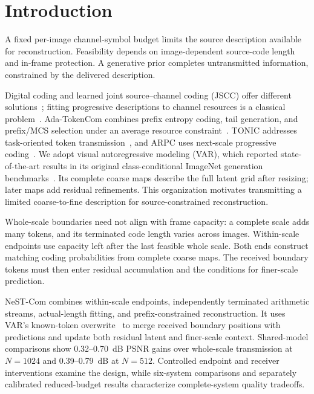 \section{Introduction}
A fixed per-image channel-symbol budget limits the source description available for reconstruction. Feasibility depends on image-dependent source-code length and in-frame protection. A generative prior completes untransmitted information, constrained by the delivered description.

Digital coding and learned joint source--channel coding (JSCC) offer different solutions~\cite{deepjscc,swinjscc}; fitting progressive descriptions to channel resources is a classical problem~\cite{chande}. Ada-TokenCom combines prefix entropy coding, tail generation, and prefix/MCS selection under an average resource constraint~\cite{adatokencom}. TONIC addresses task-oriented token transmission~\cite{tonic}, and ARPC uses next-scale progressive coding~\cite{arpc}. We adopt visual autoregressive modeling (VAR), which reported state-of-the-art results in its original class-conditional ImageNet generation benchmarks~\cite{var}. Its complete coarse maps describe the full latent grid after resizing; later maps add residual refinements. This organization motivates transmitting a limited coarse-to-fine description for source-constrained reconstruction.

Whole-scale boundaries need not align with frame capacity: a complete scale adds many tokens, and its terminated code length varies across images. Within-scale endpoints use capacity left after the last feasible whole scale. Both ends construct matching coding probabilities from complete coarse maps. The received boundary tokens must then enter residual accumulation and the conditions for finer-scale prediction.

NeST-Com combines within-scale endpoints, independently terminated arithmetic streams, actual-length fitting, and prefix-constrained reconstruction. It uses VAR's known-token overwrite~\cite{var} to merge received boundary positions with predictions and update both residual latent and finer-scale context. Shared-model comparisons show 0.32--0.70~dB PSNR gains over whole-scale transmission at $N=1024$ and 0.39--0.79~dB at $N=512$. Controlled endpoint and receiver interventions examine the design, while six-system comparisons and separately calibrated reduced-budget results characterize complete-system quality tradeoffs.
